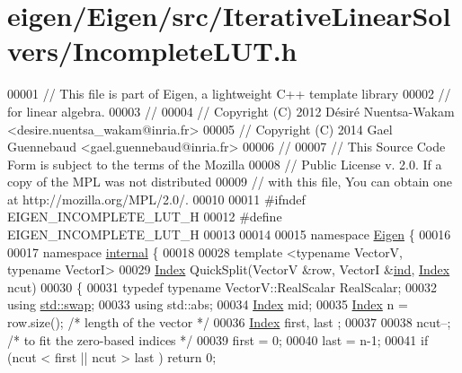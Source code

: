 \hypertarget{eigen_2_eigen_2src_2_iterative_linear_solvers_2_incomplete_l_u_t_8h_source}{}\section{eigen/\+Eigen/src/\+Iterative\+Linear\+Solvers/\+Incomplete\+L\+UT.h}
\label{eigen_2_eigen_2src_2_iterative_linear_solvers_2_incomplete_l_u_t_8h_source}

\begin{DoxyCode}
00001 \textcolor{comment}{// This file is part of Eigen, a lightweight C++ template library}
00002 \textcolor{comment}{// for linear algebra.}
00003 \textcolor{comment}{//}
00004 \textcolor{comment}{// Copyright (C) 2012 Désiré Nuentsa-Wakam <desire.nuentsa\_wakam@inria.fr>}
00005 \textcolor{comment}{// Copyright (C) 2014 Gael Guennebaud <gael.guennebaud@inria.fr>}
00006 \textcolor{comment}{//}
00007 \textcolor{comment}{// This Source Code Form is subject to the terms of the Mozilla}
00008 \textcolor{comment}{// Public License v. 2.0. If a copy of the MPL was not distributed}
00009 \textcolor{comment}{// with this file, You can obtain one at http://mozilla.org/MPL/2.0/.}
00010 
00011 \textcolor{preprocessor}{#ifndef EIGEN\_INCOMPLETE\_LUT\_H}
00012 \textcolor{preprocessor}{#define EIGEN\_INCOMPLETE\_LUT\_H}
00013 
00014 
00015 \textcolor{keyword}{namespace }\hyperlink{namespace_eigen}{Eigen} \{ 
00016 
00017 \textcolor{keyword}{namespace }\hyperlink{namespaceinternal}{internal} \{
00018     
00028 \textcolor{keyword}{template} <\textcolor{keyword}{typename} VectorV, \textcolor{keyword}{typename} VectorI>
00029 \hyperlink{namespace_eigen_a62e77e0933482dafde8fe197d9a2cfde}{Index} QuickSplit(VectorV &row, VectorI &\hyperlink{structind}{ind}, \hyperlink{namespace_eigen_a62e77e0933482dafde8fe197d9a2cfde}{Index} ncut)
00030 \{
00031   \textcolor{keyword}{typedef} \textcolor{keyword}{typename} VectorV::RealScalar RealScalar;
00032   \textcolor{keyword}{using} \hyperlink{endian_8c_a3ca5ecd34b04d6a243c054ac3a57f68d}{std::swap};
00033   \textcolor{keyword}{using} std::abs;
00034   \hyperlink{namespace_eigen_a62e77e0933482dafde8fe197d9a2cfde}{Index} mid;
00035   \hyperlink{namespace_eigen_a62e77e0933482dafde8fe197d9a2cfde}{Index} n = row.size(); \textcolor{comment}{/* length of the vector */}
00036   \hyperlink{namespace_eigen_a62e77e0933482dafde8fe197d9a2cfde}{Index} first, last ;
00037   
00038   ncut--; \textcolor{comment}{/* to fit the zero-based indices */}
00039   first = 0; 
00040   last = n-1; 
00041   \textcolor{keywordflow}{if} (ncut < first || ncut > last ) \textcolor{keywordflow}{return} 0;

\end{DoxyCode}
